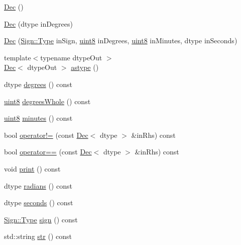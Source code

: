 \begin{DoxyCompactItemize}
\item 
\mbox{\hyperlink{class_num_c_1_1_coordinates_1_1_dec_ac55f97b493e807657cd2a1596da382fd}{Dec}} ()
\item 
\mbox{\hyperlink{class_num_c_1_1_coordinates_1_1_dec_ab8907d7ea5bc9204aaef40371270be03}{Dec}} (dtype in\+Degrees)
\item 
\mbox{\hyperlink{class_num_c_1_1_coordinates_1_1_dec_a776298864c1fa18e61d81014adbecd07}{Dec}} (\mbox{\hyperlink{struct_num_c_1_1_coordinates_1_1_sign_a915938d7fce678936d8728ca14a70e22}{Sign\+::\+Type}} in\+Sign, \mbox{\hyperlink{namespace_num_c_a60b2e2f49e1ff61059731c154e560869}{uint8}} in\+Degrees, \mbox{\hyperlink{namespace_num_c_a60b2e2f49e1ff61059731c154e560869}{uint8}} in\+Minutes, dtype in\+Seconds)
\item 
{\footnotesize template$<$typename dtype\+Out $>$ }\\\mbox{\hyperlink{class_num_c_1_1_coordinates_1_1_dec}{Dec}}$<$ dtype\+Out $>$ \mbox{\hyperlink{class_num_c_1_1_coordinates_1_1_dec_a618d31057fd90456d99b28c1b9c69f7a}{astype}} ()
\item 
dtype \mbox{\hyperlink{class_num_c_1_1_coordinates_1_1_dec_a03ea596ee39499e2f2b988c79b7340d3}{degrees}} () const
\item 
\mbox{\hyperlink{namespace_num_c_a60b2e2f49e1ff61059731c154e560869}{uint8}} \mbox{\hyperlink{class_num_c_1_1_coordinates_1_1_dec_a060d73cb1ff0003123bc30355de7b3ac}{degrees\+Whole}} () const
\item 
\mbox{\hyperlink{namespace_num_c_a60b2e2f49e1ff61059731c154e560869}{uint8}} \mbox{\hyperlink{class_num_c_1_1_coordinates_1_1_dec_af4f3861e5dfb0f7ea3d8df79ecdad327}{minutes}} () const
\item 
bool \mbox{\hyperlink{class_num_c_1_1_coordinates_1_1_dec_afa8fe40598ecc6c8258bc2d69c7382e9}{operator!=}} (const \mbox{\hyperlink{class_num_c_1_1_coordinates_1_1_dec}{Dec}}$<$ dtype $>$ \&in\+Rhs) const
\item 
bool \mbox{\hyperlink{class_num_c_1_1_coordinates_1_1_dec_a521e4249b53eb9bd38ca9cf53e37287c}{operator==}} (const \mbox{\hyperlink{class_num_c_1_1_coordinates_1_1_dec}{Dec}}$<$ dtype $>$ \&in\+Rhs) const
\item 
void \mbox{\hyperlink{class_num_c_1_1_coordinates_1_1_dec_adfbf0ebc20849e410e0332f1286d2687}{print}} () const
\item 
dtype \mbox{\hyperlink{class_num_c_1_1_coordinates_1_1_dec_a976e30bb867ec04221f77cf0ca6ac053}{radians}} () const
\item 
dtype \mbox{\hyperlink{class_num_c_1_1_coordinates_1_1_dec_a5660a795f51d52d2dbf2578d92ef284b}{seconds}} () const
\item 
\mbox{\hyperlink{struct_num_c_1_1_coordinates_1_1_sign_a915938d7fce678936d8728ca14a70e22}{Sign\+::\+Type}} \mbox{\hyperlink{class_num_c_1_1_coordinates_1_1_dec_ae2ad87383ff4db3c9b1fd1aa90262be5}{sign}} () const
\item 
std\+::string \mbox{\hyperlink{class_num_c_1_1_coordinates_1_1_dec_a0116aa3de05240cdd9730462b1baac1e}{str}} () const
\end{DoxyCompactItemize}
